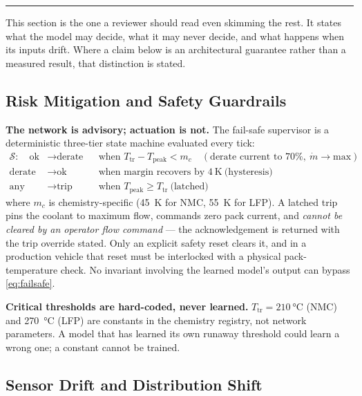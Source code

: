 \documentclass[journal,10pt,compsoc,onecolumn]{IEEEtran}
\newcommand{\hrulethin}{\par\vspace{1pt}\noindent\textcolor{rulegray}{\rule{\linewidth}{0.4pt}}\par\vspace{2pt}}
\begin{document}
\hrulethin

\noindent This section is the one a reviewer should read even skimming the rest.
It states what the model may decide, what it may never decide, and what happens
when its inputs drift. Where a claim below is an architectural guarantee rather
than a measured result, that distinction is stated.

\subsection{Risk Mitigation and Safety Guardrails}
\label{sec:safety-guards}

\noindent
\textbf{The network is advisory; actuation is not.} The fail-safe supervisor is a
deterministic three-tier state machine evaluated every tick:
\begin{align}
 \mathcal{S}: \quad
 \text{ok} &\rightarrow \text{derate} &&\text{when } T_{\mathrm{tr}}-T_{\mathrm{peak}} < m_c
            \quad (\text{derate current to } 70\%, \ \dot{m}\rightarrow\text{max}) \nonumber\\
 \text{derate} &\rightarrow \text{ok} &&\text{when margin recovers by } \SI{4}{\kelvin} \ \text{(hysteresis)} \nonumber\\
 \text{any} &\rightarrow \text{trip} &&\text{when } T_{\mathrm{peak}} \ge T_{\mathrm{tr}} \ \text{(latched)}
 \label{eq:failsafe}
\end{align}
where $m_c$ is chemistry-specific (\SI{45}{\kelvin} for NMC, \SI{55}{\kelvin}
for LFP). A latched trip pins the coolant to maximum flow, commands zero pack
current, and \emph{cannot be cleared by an operator flow command} --- the
acknowledgement is returned with the trip override stated. Only an explicit
safety reset clears it, and in a production vehicle that reset must be
interlocked with a physical pack-temperature check. No invariant involving the
learned model's output can bypass \eqref{eq:failsafe}.

\noindent
\textbf{Critical thresholds are hard-coded, never learned.}
$T_{\mathrm{tr}}=\SI{210}{\degreeCelsius}$ (NMC) and \SI{270}{\degreeCelsius}
(LFP) are constants in the chemistry registry, not network parameters. A model
that has learned its own runaway threshold could learn a wrong one; a constant
cannot be trained.

\subsection{Sensor Drift and Distribution Shift}
\label{sec:safety-drift}
\end{document}
